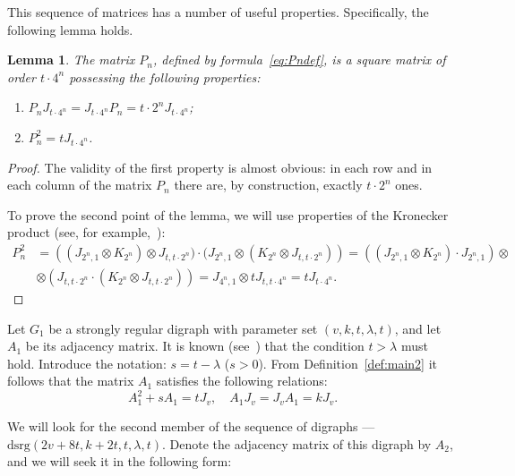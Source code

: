 \documentclass{article}
\newtheorem{lemma}{Lemma}
\begin{document}
This sequence of matrices has a number of useful properties. Specifically, the following lemma holds.

\begin{lemma}
\label{lemma:propPn}
The matrix $P_n$, defined by formula~\eqref{eq:Pndef}, is a square matrix of order $t \cdot 4^n$ possessing the following properties:
\begin{enumerate}
	\item $P_n J_{t\cdot 4^n} = J_{t\cdot 4^n} P_n = t\cdot2^n J_{t\cdot 4^n}$;
	\item $P_n^2 = t J_{t\cdot 4^n}$.
\end{enumerate} 
\end{lemma}

\begin{proof}
The validity of the first property is almost obvious: in each row and in each column of the matrix $P_n$ there are, by construction, exactly $t\cdot 2^n$ ones.

To prove the second point of the lemma, we will use properties of the Kronecker product (see, for example,~\cite{bibZhang1}):
\begin{equation}
\begin{split}
P_n^2 &= \left((J_{2^n, 1} \otimes K_{2^n}) \otimes J_{t, t\cdot 2^n}) \cdot (J_{2^n, 1} \otimes (K_{2^n} \otimes J_{t, t\cdot 2^n})\right) = \left((J_{2^n, 1} \otimes K_{2^n}) \cdot J_{2^n, 1}\right) \otimes\\
&\otimes \left(J_{t, t\cdot 2^n} \cdot (K_{2^n} \otimes J_{t, t\cdot 2^n})\right) = J_{4^n, 1} \otimes tJ_{t, t\cdot 4^n} = tJ_{t\cdot 4^n}.
\end{split}
\end{equation}
\end{proof}

Let $G_1$ be a strongly regular digraph with parameter set $(v, k, t, \lambda, t)$, and let $A_1$ be its adjacency matrix. It is known (see~\cite{bibDuval1}) that the condition $t > \lambda$ must hold. Introduce the notation: $s = t - \lambda$ ($s > 0$). From Definition~\ref{def:main2} it follows that the matrix $A_1$ satisfies the following relations:
\begin{equation}
\label{eq:condsA1}
A_1^2 + sA_1 = tJ_v, \quad A_1 J_v = J_v A_1 = k J_v.
\end{equation}

We will look for the second member of the sequence of digraphs --- $\text{dsrg}(2v+8t, k+2t, t, \lambda, t)$. Denote the adjacency matrix of this digraph by $A_2$, and we will seek it in the following form:
\end{document}
